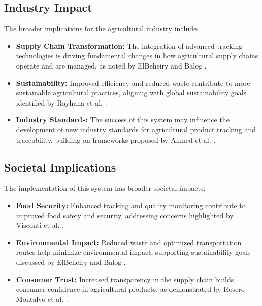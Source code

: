 \documentclass[conference]{IEEEtran}
\begin{document}
\subsection{Industry Impact}
The broader implications for the agricultural industry include:

\begin{itemize}
    \item \textbf{Supply Chain Transformation:} The integration of advanced tracking technologies is driving fundamental changes in how agricultural supply chains operate and are managed, as noted by ElBeheiry and Balog \cite{elbeheiry2023technologies}.
    
    \item \textbf{Sustainability:} Improved efficiency and reduced waste contribute to more sustainable agricultural practices, aligning with global sustainability goals identified by Rayhana et al. \cite{rayhana2021rfid}.
    
    \item \textbf{Industry Standards:} The success of this system may influence the development of new industry standards for agricultural product tracking and traceability, building on frameworks proposed by Ahmed et al. \cite{ahmed2024optimized}.
\end{itemize}

\subsection{Societal Implications}
The implementation of this system has broader societal impacts:

\begin{itemize}
    \item \textbf{Food Security:} Enhanced tracking and quality monitoring contribute to improved food safety and security, addressing concerns highlighted by Visconti et al. \cite{visconti2020development}.
    
    \item \textbf{Environmental Impact:} Reduced waste and optimized transportation routes help minimize environmental impact, supporting sustainability goals discussed by ElBeheiry and Balog \cite{elbeheiry2023technologies}.
    
    \item \textbf{Consumer Trust:} Increased transparency in the supply chain builds consumer confidence in agricultural products, as demonstrated by Rosero-Montalvo et al. \cite{rosero2023smart}.
\end{itemize}



\end{document}
